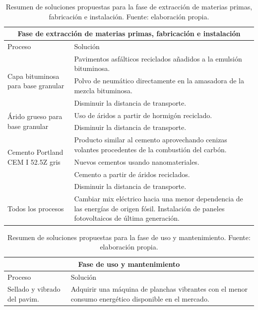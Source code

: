 \begin{table}[!htbp]
\centering
\begin{tabular}{p{5cm}p{9cm}}
\toprule
\multicolumn{2}{c}{Fase de extracción de materias primas, fabricación e instalación}\\
\midrule
Proceso & Solución\\
\midrule
\multirow{3}{*}{{\footnotesize Capa bituminosa para base granular}} & Pavimentos asfálticos reciclados añadidos a la emulsión bituminosa.\\
& Polvo de neumático directamente en la amasadora de la mezcla bituminosa.\\
& Disminuir la distancia de transporte.\\
\midrule
\multirow{2}{*}{{\footnotesize Árido grueso para base granular}} & Uso de áridos a partir de hormigón reciclado.\\
& Disminuir la distancia de transporte.\\
\midrule
\multirow{3}{*}{{\footnotesize Cemento Portland CEM I 52.5Z gris}} & Producto similar al cemento aprovechando cenizas volantes procedentes de la combustión del carbón.\\
& Nuevos cementos usando nanomateriales.\\
& Cemento a partir de áridos reciclados.\\
& Disminuir la distancia de transporte.\\
\midrule
{\footnotesize Todos los procesos} & Cambiar mix eléctrico hacia una menor dependencia de las energías de origen fósil. Instalación de paneles fotovoltaicos de última generación.\\
\bottomrule
\end{tabular}
\caption[Resumen de soluciones propuestas para la fase de extracción de materias primas, fabricación e instalación.]{Resumen de soluciones propuestas para la fase de extracción de materias primas, fabricación e instalación. Fuente: elaboración propia.}
\label{resumensolucionesfabric}
\end{table}

\begin{table}[!htbp]
\centering
\begin{tabular}{p{5cm}p{9cm}}
\toprule
\multicolumn{2}{c}{Fase de uso y mantenimiento}\\
\midrule
Proceso & Solución\\
\midrule
{\footnotesize Sellado y vibrado del pavim.} & Adquirir una máquina de planchas vibrantes con el menor consumo energético disponible en el mercado.\\
\bottomrule
\end{tabular}
\caption[Resumen de soluciones propuestas para la fase de uso y mantenimiento.]{Resumen de soluciones propuestas para la fase de uso y mantenimiento. Fuente: elaboración propia.}
\label{resumensolucionesuso}
\end{table}

